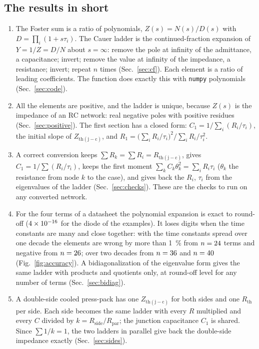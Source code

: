\documentclass[10pt,a4paper]{scrartcl}
\newcommand{\Zjc}{Z_\mathrm{th(j-c)}}
\newcommand{\Rth}{R_\mathrm{th}}
\newcommand{\Rjc}{R_\mathrm{th(j-c)}}
\newcommand{\Rpar}{R_\mathrm{par}}
\newcommand{\code}[1]{\texttt{#1}}
\begin{document}
\subsection*{The results in short}
\begin{enumerate}
\item The Foster sum is a ratio of polynomials, $Z(s) = N(s)/D(s)$ with $D = \prod_i (1+s\tau_i)$. The Cauer ladder is the continued-fraction expansion of $Y = 1/Z = D/N$ about $s = \infty$: remove the pole at infinity of the admittance, a capacitance; invert; remove the value at infinity of the impedance, a resistance; invert; repeat $n$ times (Sec.~\ref{sec:cf}). Each element is a ratio of leading coefficients. The function does exactly this with \code{numpy} polynomials (Sec.~\ref{sec:code}).
\item All the elements are positive, and the ladder is unique, because $Z(s)$ is the impedance of an RC network: real negative poles with positive residues (Sec.~\ref{sec:positive}). The first section has a closed form: $C_1 = 1/\sum_i (R_i/\tau_i)$, the initial slope of $\Zjc$, and $R_1 = \bigl(\sum_i R_i/\tau_i\bigr)^2 \big/ \sum_i R_i/\tau_i^2$.
\item A correct conversion keeps $\sum R_k = \sum R_i = \Rjc$, gives $C_1 = 1/\sum (R_i/\tau_i)$, keeps the first moment $\sum_k C_k \theta_k^2 = \sum_i R_i\tau_i$ ($\theta_k$ the resistance from node $k$ to the case), and gives back the $R_i$, $\tau_i$ from the eigenvalues of the ladder (Sec.~\ref{sec:checks}). These are the checks to run on any converted network.
\item For the four terms of a datasheet the polynomial expansion is exact to round-off ($4\times 10^{-16}$ for the diode of the examples). It loses digits when the time constants are many and close together: with the time constants spread over one decade the elements are wrong by more than \SI{1}{\percent} from $n = 24$ terms and negative from $n = 26$; over two decades from $n = 36$ and $n = 40$ (Fig.~\ref{fig:accuracy}). A bidiagonalization of the eigenvalue form gives the same ladder with products and quotients only, at round-off level for any number of terms (Sec.~\ref{sec:bidiag}).
\item A double-side cooled press-pack has one $\Zjc$ for both sides and one $\Rth$ per side. Each side becomes the same ladder with every $R$ multiplied and every $C$ divided by $k = R_\mathrm{side}/\Rpar$; the junction capacitance $C_1$ is shared. Since $\sum 1/k = 1$, the two ladders in parallel give back the double-side impedance exactly (Sec.~\ref{sec:sides}).

\end{enumerate}
\end{document}
